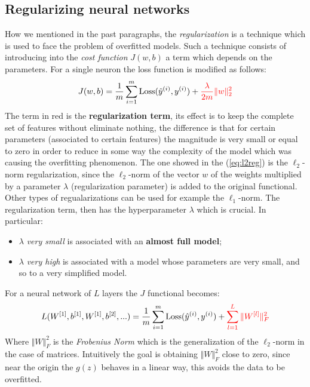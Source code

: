 \subsection{Regularizing neural networks}
How we mentioned in the past paragraphs, the \textit{regularization} is a technique which is used to face the problem of overfitted models. Such a technique consists of introducing into the \textit{cost function} $J(w,b)$ a term which depends on the parameters.
For a single neuron the loss function is modified as follows:
\begin{equation} \label{eq:l2reg}
    J(w,b)=\frac{1}{m} \sum_{i=1}^{m} {\text{Loss}(\hat{y}^{(i)}, y^{(i)})+
    {\color{red}\frac{\lambda}{2m}{\Vert w \Vert_2^2}}}
\end{equation}
The term in red is the \textbf{regularization term}, its effect is to keep the complete set of features without eliminate nothing, the difference is that for certain parameters (associated to certain features) the magnitude is very small or equal to zero in order to reduce in some way the complexity of the model which was causing the overfitting phenomenon. The one showed in the (\ref{eq:l2reg}) is the $\ell_2$-norm regularization, since the $\ell_2$-norm of the vector $w$ of the weights multiplied by a parameter $\lambda$ (regularization parameter) is added to the original functional. Other types of regualarizations can be used for example the $\ell_1$-norm. The regularization term, then has the hyperparameter $\lambda$ which is crucial. In particular:
\begin{itemize}
    \itemsep-0.3em
    \item $\lambda$ \textit{very small} is associated with an \textbf{almost full model}; 
    \item $\lambda$  \textit{very high} is associated with a model whose parameters are very small, and so to a very simplified model.
\end{itemize}
For a neural network of $L$ layers the $J$ functional becomes:
\begin{equation}
    L(W^{[1]}, b^{[1]}, W^{[1]}, b^{[2]}, ...)=\frac{1}{m} \sum_{i=1}^{m} {\text{Loss}(\hat{y}^{(i)}, y^{(i)})}+
    {\color{red}\sum_{l=1}^{L}{\Vert{W^{[l]}}\Vert_F^2}}
\end{equation} 
Where {$\Vert{W}\Vert_F^2$} is the \textit{Frobenius Norm} which is the generalization of the $\ell_2$-norm in the case of matrices. Intuitively the goal is obtaining $\Vert{W}\Vert_F^2$ close to zero, since near the origin the $g(z)$ behaves in a linear way, this avoids the data to be overfitted.\\

